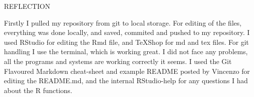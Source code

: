 REFLECTION

Firstly I pulled my repository from git to local storage. For editing of the files, everything was done locally, and saved, commited and pushed to my repository. I used RStudio for editing the Rmd file, and TeXShop for md and tex files. For git handling I use the terminal, which is working great. I did not face any problems, all the programs and systems are working correctly it seems. I used the Git Flavoured Markdown cheat-sheet and example README posted by Vincenzo for editing the README.md, and the internal RStudio-help for any questions I had about the R functions.